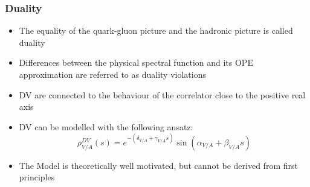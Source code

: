 \documentclass{beamer}
\begin{document}
\begin{frame}
  \frametitle{Duality}
  \begin{itemize}
  \item The equality of the quark-gluon picture and the hadronic picture is
    called duality
  \item Differences between the physical spectral function and its OPE
    approximation are referred to as duality violations
  \item DV are connected to the behaviour of the correlator close to the
    positive real axis
    
    \vfill

  \item DV can be modelled with the following ansatz:
    \begin{equation}
      \rho_{V/A}^{DV}(s) = e^{-(\delta_{V/A} + \gamma_{V/A}s)} \sin(\alpha_{V/A} + \beta_{V/A}s)
    \end{equation}
    \begin{scriptsize}
      \cite{Boito2011a}
    \end{scriptsize}
  \item The Model is theoretically well motivated, but cannot be derived from
    first principles
  \end{itemize}
\end{frame}
\end{document}
